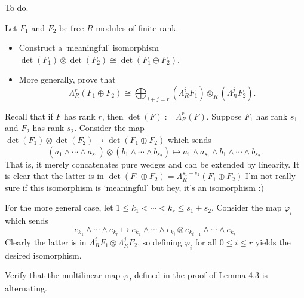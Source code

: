 \documentclass[../../master.tex]{subfiles}
\begin{document}
\begin{solution}
    To do.
\end{solution}

\begin{problem}
    Let $F_1$ and $F_2$ be free $R$-modules of finite rank.
    \begin{itemize}
        \item Construct a `meaningful' isomorphism $\det(F_1) \otimes \det(F_2) \cong \det(F_1 \oplus F_2)$.
        \item More generally, prove that
            \[
            \Lambda_R^{r}(F_1 \oplus F_2) \cong \bigoplus_{i+j=r} (\Lambda_R^{i} F_1) \otimes_R (\Lambda_R^{j} F_2).
            \]
    \end{itemize}
\end{problem}

\begin{solution}
    Recall that if $F$ has rank $r$, then $\det(F) := \Lambda_R^{r}(F)$.
    Suppose $F_1$ has rank $s_1$ and $F_2$ has rank $s_2$.
    Consider the map $\det(F_1) \otimes \det(F_2) \to \det(F_1 \oplus F_2)$ which sends
    \[
        (a_1 \wedge \cdots \wedge a_{s_1}) \otimes (b_1 \wedge \cdots \wedge b_{s_2}) \mapsto a_1 \wedge a_{s_1} \wedge b_1 \wedge \cdots \wedge b_{s_2}.
    \]
    That is, it merely concatenates pure wedges and can be extended by linearity.
    It is clear that the latter is in $\det(F_1 \oplus F_2) = \Lambda_R^{s_1+s_2}(F_1 \oplus F_2)$
    I'm not really sure if this isomorphism is `meaningful' but hey, it's an isomorphism :)

    For the more general case, let $1 \leq k_1 < \cdots < k_r \leq s_1 + s_2$.
    Consider the map $\varphi_i$ which sends
    \[
    e_{k_1} \wedge \cdots \wedge e_{k_r} \mapsto e_{k_1} \wedge \cdots \wedge e_{k_i} \otimes e_{k_{i+1}} \wedge \cdots \wedge e_{k_r}
    \]
    Clearly the latter is in $\Lambda_R^{i}F_1 \otimes \Lambda_R^{j}F_2$, so defining $\varphi_i$ for all $0 \leq i \leq r$ yields the desired isomorphism.
\end{solution}

\begin{problem}
    Verify that the multilinear map $\varphi_I$ defined in the proof of Lemma 4.3 is alternating.
\end{problem}
\end{document}
